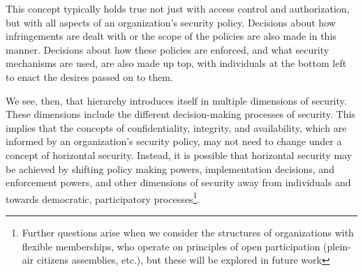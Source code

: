 This concept typically holds true not just with access control and
authorization, but with all aspects of an organization's security policy.
Decisions about how infringements are dealt with or the scope of the policies
are also made in this manner. Decisions about how these policies are enforced,
and what security mechanisms are used, are also made up top, with individuals at
the bottom left to enact the desires passed on to them.

We see, then, that hierarchy introduces itself in multiple dimensions of
security. These dimensions include the different decision-making processes
of security. This implies that the concepts of confidentiality, integrity, and
availability, which are informed by an organization's security policy, may not
need to change under a concept of horizontal security. Instead, it is possible
that horizontal security may be achieved by shifting policy making powers,
implementation decisions, and enforcement powers, and other dimensions of
security away from individuals and towards democratic, participatory 
processes\footnote{Further questions arise when we consider the structures of
organizations with flexible memberships, who operate on principles of open 
participation (plein-air citizens assemblies, etc.), but these will be explored
in future work}.

%
%
%

